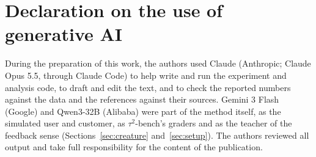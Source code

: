 \documentclass[10pt,a4paper,twoside]{article}
\begin{document}
\section*{Declaration on the use of generative AI}
During the preparation of this work, the authors used Claude (Anthropic; Claude Opus 5.5, through Claude Code) to help write and run the experiment and analysis code, to draft and edit the text, and to check the reported numbers against the data and the references against their sources. Gemini 3 Flash (Google) and Qwen3-32B (Alibaba) were part of the method itself, as the simulated user and customer, as $\tau^2$-bench's graders and as the teacher of the feedback sense (Sections~\ref{sec:creature} and~\ref{sec:setup}). The authors reviewed all output and take full responsibility for the content of the publication.




\appendix
{}
\renewcommand{\thetable}{\Alph{section}\arabic{table}}\renewcommand{\thefigure}{\Alph{section}\arabic{figure}}




\end{document}
